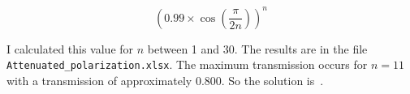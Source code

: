 \documentclass{article}
\begin{document}
\[
\left(0.99\times\cos\left(\frac{\pi}{2n}\right)\right)^n
\]

I calculated this value for $n$ between 1 and 30.
The results are in the file \texttt{Attenuated\_polarization.xlsx}.
The maximum transmission occurs for $n=11$ with a transmission of approximately 0.800.
So the solution is \,.
\end{document}
